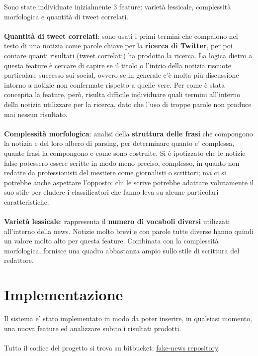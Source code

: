\documentclass{article}
\begin{document}
\begin{multicols}{2}
			Sono state individuate inizialmente 3 feature: varietà lessicale, complessità morfologica e quantità di tweet correlati. 				
			\\~\\
			\textbf{Quantità di tweet correlati}: sono usati i primi termini che compaiono nel testo di una notizia come parole chiave per la \textbf{ricerca di Twitter}, per poi contare quanti risultati (tweet correlati) ha prodotto la ricerca. La logica dietro a questa feature è cercare di capire se il titolo o l'inizio della notizia riscuote particolare successo sui social, ovvero se in generale c'è molta più discussione intorno a notizie non confermate rispetto a quelle vere. Per come è stata concepita la feature, però, risulta difficile individuare quali termini all'interno della notizia utilizzare per la ricerca, dato che l'uso di troppe parole non produce mai nessun risultato.
			\\~\\
			\textbf{Complessità morfologica}: analisi della \textbf{struttura delle frasi} che compongono la notizia e del loro albero di parsing, per determinare quanto e' complessa, quante frasi la compongono e come sono costruite.
			Si è ipotizzato che le notizie false potessero essere scritte in modo meno preciso, complesso, in quanto non redatte da professionisti del mestiere come giornalisti o scrittori; ma ci si potrebbe anche aspettare l'opposto: chi le scrive potrebbe adattare volutamente il suo stile per eludere i classificatori che fanno leva su alcune particolari caratteristiche.
			\\~\\
			\textbf{Varietà lessicale}: rappresenta il \textbf{numero di vocaboli diversi} utilizzati all'interno della news. Notizie molto brevi e con parole tutte diverse hanno quindi un valore molto alto per questa feature.
			Combinata con la complessità morfologica, fornisce una quadro abbastanza ampio sullo stile di scrittura del redattore.

		    
	    \section{Implementazione}
		    Il sistema e' stato implementato in modo da poter inserire, in qualsiasi momento, una nuova feature ed analizzare subito i risultati prodotti.\\~\\
		    Tutto il codice del progetto si trova su bitbucket: 
		    \href{https://bitbucket.org/IcedGarion/fake-news}{fake-news repository}. 
		    

\end{multicols}
\end{document}

